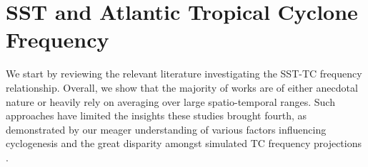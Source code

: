 \documentclass[a4paper,10pt]{article}
\begin{document}

\section{SST and Atlantic Tropical Cyclone Frequency}
We start by reviewing the relevant literature investigating the SST-TC frequency relationship. Overall, we show that the majority of works are of either anecdotal nature or heavily rely on averaging over large spatio-temporal ranges. Such approaches have limited the insights these studies brought fourth, as demonstrated by our meager understanding of various factors influencing cyclogenesis \cite{emanuel2003, pielke2005a} and the great disparity amongst simulated TC frequency projections \cite{knutson2010}.
\end{document}
